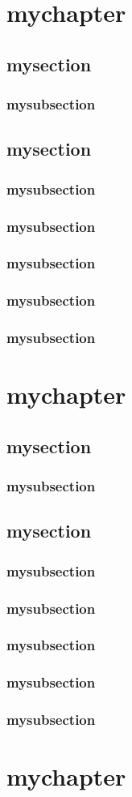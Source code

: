 \documentclass{book}
\begin{document}
\tableofcontents

\chapter{mychapter} 
\section{mysection}
\subsection{mysubsection}
\section{mysection}
\subsection{mysubsection}
\subsection{mysubsection}
\subsection{mysubsection}
\subsection{mysubsection}
\subsection{mysubsection}
\chapter{mychapter} 
\section{mysection}
\subsection{mysubsection}
\section{mysection}
\subsection{mysubsection}
\subsection{mysubsection}
\subsection{mysubsection}
\subsection{mysubsection}
\subsection{mysubsection}
\chapter{mychapter} 
\end{document}
